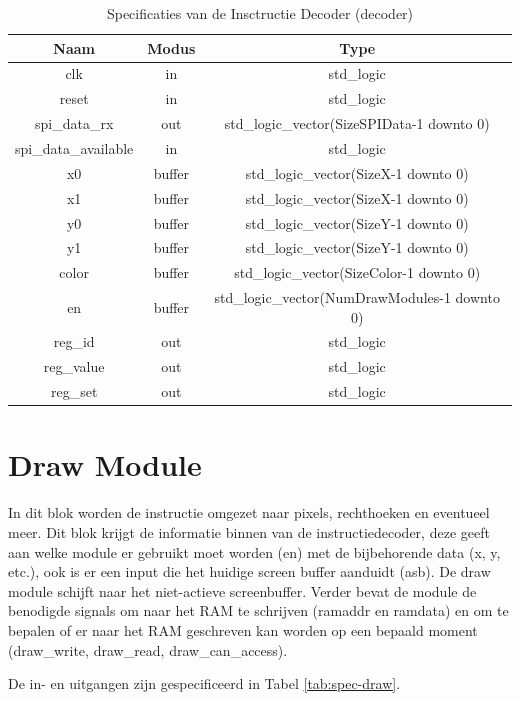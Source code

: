 \documentclass{scrreprt} %
\begin{document}
\begin{table}[H]
\centering
\caption{Specificaties van de Insctructie Decoder (decoder)}
\label{tab:spec-decoder}
\begin{tabular}{c c c}
	\hline\hline
 	Naam & Modus & Type\\
 	\hline
	clk & in & std\_logic \\
	reset & in & std\_logic \\	
	spi\_data\_rx & out & std\_logic\_vector(SizeSPIData-1 downto 0) \\
	spi\_data\_available & in & std\_logic \\
	x0 &  buffer & std\_logic\_vector(SizeX-1 downto 0) \\
	x1 &  buffer & std\_logic\_vector(SizeX-1 downto 0) \\
	y0 &  buffer & std\_logic\_vector(SizeY-1 downto 0) \\
	y1 &  buffer & std\_logic\_vector(SizeY-1 downto 0) \\
	color &  buffer & std\_logic\_vector(SizeColor-1 downto 0) \\
	en & buffer & std\_logic\_vector(NumDrawModules-1 downto 0)\\
	reg\_id & out & std\_logic \\
	reg\_value & out & std\_logic \\
	reg\_set & out & std\_logic \\
  	\hline
\end{tabular}
\end{table}

\section{Draw Module}
In dit blok worden de instructie omgezet naar pixels, rechthoeken en eventueel meer.
Dit blok krijgt de informatie binnen van de instructiedecoder, deze geeft aan welke module er gebruikt moet worden (en) met de bijbehorende data (x, y, etc.), ook is er een input die het huidige screen buffer aanduidt (asb).
De draw module schijft naar het niet-actieve screenbuffer.
Verder bevat de module de benodigde signals om naar het RAM te schrijven (ramaddr en ramdata) en om te bepalen of er naar het RAM geschreven kan worden op een bepaald moment (draw\_write, draw\_read, draw\_can\_access).

De in- en uitgangen zijn gespecificeerd in Tabel \ref{tab:spec-draw}.
\end{document}
